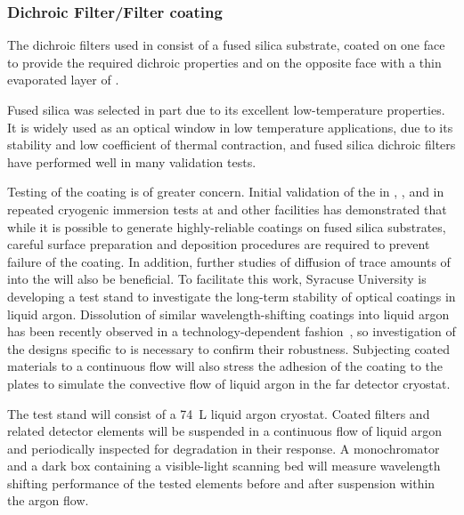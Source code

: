 \subsubsection{Dichroic Filter/Filter coating}

The dichroic filters used in  consist of a fused silica substrate, coated on one face to provide the required dichroic properties and on the opposite face with a thin evaporated layer of .

Fused silica was selected in part due to its excellent low-temperature properties.  It is widely used as an optical window in low temperature applications, due to its stability and low coefficient of thermal contraction, and fused silica dichroic filters have performed well in many  validation tests.

Testing of the  coating is of greater concern.  Initial validation of the  in , , and in repeated cryogenic immersion tests at  and other facilities has demonstrated that while it is possible to generate highly-reliable  coatings on fused silica substrates, careful surface preparation and deposition procedures are required to prevent failure of the coating.  In addition, further studies of diffusion of trace amounts of  into the  will also be beneficial.  To facilitate this work,  
Syracuse University is 
 developing a test stand to investigate the long-term stability of  optical coatings in liquid argon. Dissolution of similar wavelength-shifting coatings into liquid argon has been recently observed in a technology-dependent fashion~\cite{Asaadi:2018ixs}, so investigation of the designs specific to  is necessary to confirm their robustness. Subjecting coated materials to a continuous flow will also stress the adhesion of the coating to the plates to simulate the convective flow of liquid argon in the far detector cryostat.

The test stand will consist of a \SI{74}{L} liquid argon cryostat. Coated filters and related detector elements will be suspended in a continuous flow of liquid argon and periodically inspected for degradation in their response. A  monochromator and a dark box containing a visible-light scanning bed will measure wavelength shifting performance of the tested elements before and after suspension within the argon flow.

